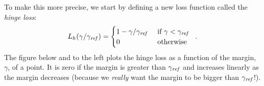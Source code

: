 \noindent To make this more precise, we start by defining a new loss function
called the {\em hinge loss}:
\[
  L_h (\gamma / \gamma_{\it ref}) =
    \begin{cases}
      1 - \gamma / \gamma_{\it ref} & \text{ if } \gamma < \gamma_{\it ref} \\
      0 & \text{ otherwise}
    \end{cases}\;\;.
\]
The figure below and to the left plots the hinge loss as a function of
the margin, $\gamma$, of a point.  It is zero if the margin is greater
than $\gamma_{\it ref}$ and increases linearly as the margin decreases
(because we {\em really} want the margin to be bigger than
$\gamma_{\it ref}$!).
